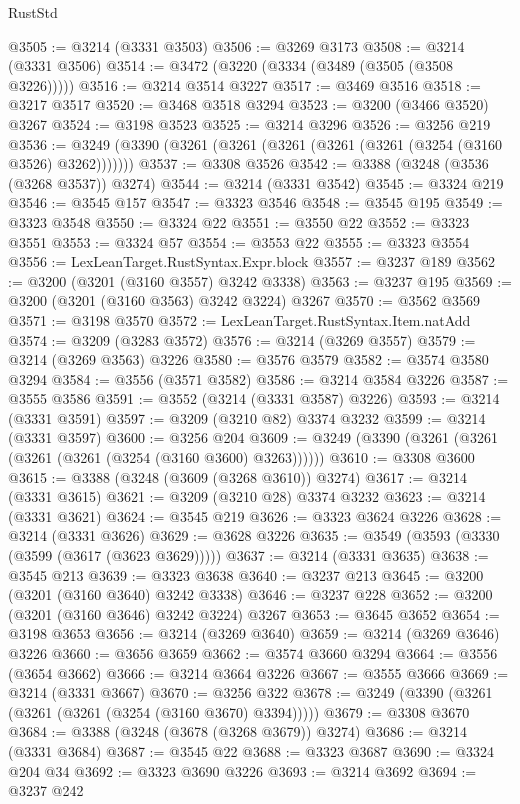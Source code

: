 \begin{lexlean}{RustStd}
\begin{coremodule}
@3505 := @3214 (@3331 @3503)
@3506 := @3269 @3173
@3508 := @3214 (@3331 @3506)
@3514 := @3472 (@3220 (@3334 (@3489 (@3505 (@3508 @3226)))))
@3516 := @3214 @3514 @3227
@3517 := @3469 @3516
@3518 := @3217 @3517
@3520 := @3468 @3518 @3294
@3523 := @3200 (@3466 @3520) @3267
@3524 := @3198 @3523
@3525 := @3214 @3296
@3526 := @3256 @219
@3536 := @3249 (@3390 (@3261 (@3261 (@3261 (@3261 (@3261 (@3254 (@3160 @3526) @3262)))))))
@3537 := @3308 @3526
@3542 := @3388 (@3248 (@3536 (@3268 @3537)) @3274)
@3544 := @3214 (@3331 @3542)
@3545 := @3324 @219
@3546 := @3545 @157
@3547 := @3323 @3546
@3548 := @3545 @195
@3549 := @3323 @3548
@3550 := @3324 @22
@3551 := @3550 @22
@3552 := @3323 @3551
@3553 := @3324 @57
@3554 := @3553 @22
@3555 := @3323 @3554
@3556 := LexLeanTarget.RustSyntax.Expr.block
@3557 := @3237 @189
@3562 := @3200 (@3201 (@3160 @3557) @3242 @3338)
@3563 := @3237 @195
@3569 := @3200 (@3201 (@3160 @3563) @3242 @3224) @3267
@3570 := @3562 @3569
@3571 := @3198 @3570
@3572 := LexLeanTarget.RustSyntax.Item.natAdd
@3574 := @3209 (@3283 @3572)
@3576 := @3214 (@3269 @3557)
@3579 := @3214 (@3269 @3563) @3226
@3580 := @3576 @3579
@3582 := @3574 @3580 @3294
@3584 := @3556 (@3571 @3582)
@3586 := @3214 @3584 @3226
@3587 := @3555 @3586
@3591 := @3552 (@3214 (@3331 @3587) @3226)
@3593 := @3214 (@3331 @3591)
@3597 := @3209 (@3210 @82) @3374 @3232
@3599 := @3214 (@3331 @3597)
@3600 := @3256 @204
@3609 := @3249 (@3390 (@3261 (@3261 (@3261 (@3261 (@3254 (@3160 @3600) @3263))))))
@3610 := @3308 @3600
@3615 := @3388 (@3248 (@3609 (@3268 @3610)) @3274)
@3617 := @3214 (@3331 @3615)
@3621 := @3209 (@3210 @28) @3374 @3232
@3623 := @3214 (@3331 @3621)
@3624 := @3545 @219
@3626 := @3323 @3624 @3226
@3628 := @3214 (@3331 @3626)
@3629 := @3628 @3226
@3635 := @3549 (@3593 (@3330 (@3599 (@3617 (@3623 @3629)))))
@3637 := @3214 (@3331 @3635)
@3638 := @3545 @213
@3639 := @3323 @3638
@3640 := @3237 @213
@3645 := @3200 (@3201 (@3160 @3640) @3242 @3338)
@3646 := @3237 @228
@3652 := @3200 (@3201 (@3160 @3646) @3242 @3224) @3267
@3653 := @3645 @3652
@3654 := @3198 @3653
@3656 := @3214 (@3269 @3640)
@3659 := @3214 (@3269 @3646) @3226
@3660 := @3656 @3659
@3662 := @3574 @3660 @3294
@3664 := @3556 (@3654 @3662)
@3666 := @3214 @3664 @3226
@3667 := @3555 @3666
@3669 := @3214 (@3331 @3667)
@3670 := @3256 @322
@3678 := @3249 (@3390 (@3261 (@3261 (@3261 (@3254 (@3160 @3670) @3394)))))
@3679 := @3308 @3670
@3684 := @3388 (@3248 (@3678 (@3268 @3679)) @3274)
@3686 := @3214 (@3331 @3684)
@3687 := @3545 @22
@3688 := @3323 @3687
@3690 := @3324 @204 @34
@3692 := @3323 @3690 @3226
@3693 := @3214 @3692
@3694 := @3237 @242

\end{coremodule}
\end{lexlean}
